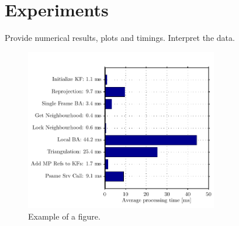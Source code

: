 \chapter{Experiments}\label{sec:experiments}

Provide numerical results, plots and timings. Interpret the data.

\begin{figure}[h]
   \centering
   \includegraphics[width=0.75\textwidth]{img/processing_time.pdf}
   \caption{Example of a figure.}
   \label{img:timing}
\end{figure}